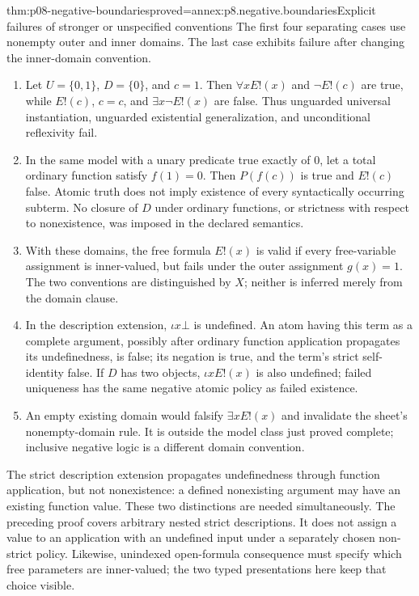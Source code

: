 \begin{hbtheorem}{thm:p08-negative-boundaries}{proved=annex:p8.negative.boundaries}{Explicit failures of stronger or unspecified conventions}
The first four separating cases use nonempty outer and inner domains.
The last case exhibits failure after changing the inner-domain convention.
\begin{enumerate}
\item Let \(U=\{0,1\}\), \(D=\{0\}\), and \(c=1\).
      Then \(\forall xE!(x)\) and \(\neg E!(c)\) are true, while
      \(E!(c)\), \(c=c\), and \(\exists x\neg E!(x)\) are false.
      Thus unguarded universal instantiation, unguarded existential
      generalization, and unconditional reflexivity fail.
\item In the same model with a unary predicate true exactly of \(0\),
      let a total ordinary function satisfy \(f(1)=0\).  Then
      \(P(f(c))\) is true and \(E!(c)\) false.  Atomic truth does not
      imply existence of every syntactically occurring subterm.  No closure
      of \(D\) under ordinary functions, or strictness with respect to
      nonexistence, was imposed in the declared semantics.
\item With these domains, the free formula \(E!(x)\) is valid if every
      free-variable assignment is inner-valued, but fails under the outer
      assignment \(g(x)=1\).  The two conventions are distinguished by
      \(X\); neither is inferred merely from the domain clause.
\item In the description extension, \(\iota x\bot\) is undefined.
      An atom having this term as a complete argument, possibly after
      ordinary function application propagates its undefinedness, is false;
      its negation is true, and the term's strict self-identity false.
      If \(D\) has two objects, \(\iota xE!(x)\)
      is also undefined; failed uniqueness has the same negative atomic
      policy as failed existence.
\item An empty existing domain would falsify \(\exists xE!(x)\) and
      invalidate the sheet's nonempty-domain rule.  It is outside the model
      class just proved complete; inclusive negative logic is a different
      domain convention.
\end{enumerate}
\end{hbtheorem}

The strict description extension propagates undefinedness through function
application, but not nonexistence: a defined nonexisting argument may have
an existing function value.  These two distinctions are needed simultaneously.
The preceding proof covers arbitrary nested strict descriptions.  It does
not assign a value to an application with an undefined input under a
separately chosen non-strict policy.  Likewise, unindexed open-formula
consequence must specify which free parameters are inner-valued; the two
typed presentations here keep that choice visible.

